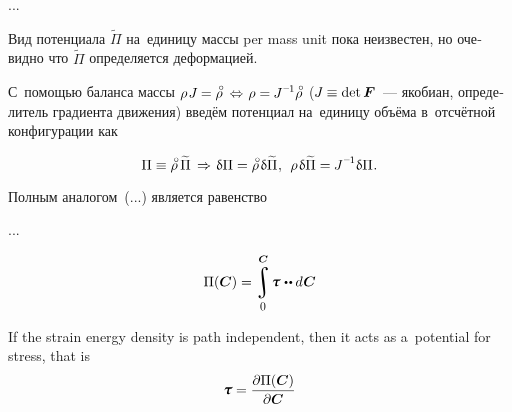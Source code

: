 \begin{otherlanguage}{russian}
...

Вид потенциала ${\widetilde{\Pi}}$ на~единицу \hbox{массы} per mass unit пока неизвестен, но очевидно что ${\widetilde{\Pi}}$ определяется деформацией.

С~помощью баланса массы ${\rho \hspace{.2ex} J \hspace{-0.1ex} = \mathcircabove{\rho} \hspace{.5ex} \Leftrightarrow \hspace{.2ex} \rho = \hspace{-0.1ex} J^{\expminusone} \mathcircabove{\rho}}$ (${J \hspace{-0.1ex} \equiv \operatorname{det} \bm{F}\hspace{-0.12ex}}$~--- якобиан, определитель градиента движения) введём потенциал на~единицу объёма в~отсчётной конфигурации как

\nopagebreak\begin{equation}
\Pi \equiv \mathcircabove{\rho} \hspace{.4ex} \widetilde{\Pi}
\hspace{.4ex} \Rightarrow \hspace{.2ex}
\variation{\Pi} = \mathcircabove{\rho} \hspace{.25ex} \variation{\widetilde{\Pi}}
\hspace{.1ex}, \:\:
\rho \hspace{.2ex} \variation{\widetilde{\Pi}} = \hspace{-0.1ex} J^{\expminusone} \variation{\Pi} \hspace{.1ex}.
\end{equation}

Полным аналогом~(...) является равенство



...

{\small

\[ \Pi({\boldsymbol{\bm{C}}}) = \displaystyle \integral_{\raisemath{-0.25em}{\hspace{-0.1ex}\scalebox{0.85}{$0$}}}^{\raisemath{.15em}{\bm{C}}} \hspace{-0.25ex} \mathboldtau \hspace{.1ex} \dotdotp d \hspace{.1ex} \boldsymbol{\bm{C}} \]

If the strain energy density is path independent, then it acts as a~potential for stress, that is
\[ \displaystyle \mathboldtau = {\frac{\partial \Pi(\bm{C})}{\partial \bm{C}}} \]

}
\end{otherlanguage}
